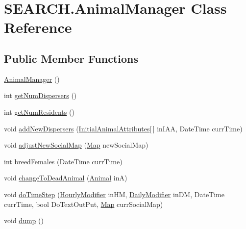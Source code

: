 \hypertarget{class_s_e_a_r_c_h_1_1_animal_manager}{\section{S\-E\-A\-R\-C\-H.\-Animal\-Manager Class Reference}
\label{class_s_e_a_r_c_h_1_1_animal_manager}
}
\subsection*{Public Member Functions}
\begin{DoxyCompactItemize}
\item 
\hyperlink{class_s_e_a_r_c_h_1_1_animal_manager_ab06ac6961b7e2e54209cd69799613b16}{Animal\-Manager} ()
\item 
int \hyperlink{class_s_e_a_r_c_h_1_1_animal_manager_af3d578bc12adec2c51f3ffd3d322f957}{get\-Num\-Dispersers} ()
\item 
int \hyperlink{class_s_e_a_r_c_h_1_1_animal_manager_add6db1dd2dfaa4335a508dd8357f6e3f}{get\-Num\-Residents} ()
\item 
void \hyperlink{class_s_e_a_r_c_h_1_1_animal_manager_a7d7b49737303ee1f5bb9e6774c2d1421}{add\-New\-Dispersers} (\hyperlink{class_s_e_a_r_c_h_1_1_initial_animal_attributes}{Initial\-Animal\-Attributes}\mbox{[}$\,$\mbox{]} in\-I\-A\-A, Date\-Time curr\-Time)
\item 
void \hyperlink{class_s_e_a_r_c_h_1_1_animal_manager_ac83809e22ce75662e738c06cb6b3f97a}{adjust\-New\-Social\-Map} (\hyperlink{class_s_e_a_r_c_h_1_1_map}{Map} new\-Social\-Map)
\item 
int \hyperlink{class_s_e_a_r_c_h_1_1_animal_manager_a09b650261c078d2435b8fe022b6fc19e}{breed\-Females} (Date\-Time curr\-Time)
\item 
void \hyperlink{class_s_e_a_r_c_h_1_1_animal_manager_aba58794e113743b4a8708e0b99a63fe2}{change\-To\-Dead\-Animal} (\hyperlink{class_s_e_a_r_c_h_1_1_animal}{Animal} in\-A)
\item 
void \hyperlink{class_s_e_a_r_c_h_1_1_animal_manager_a935cde1ac6704e8535d45746b64a3eb8}{do\-Time\-Step} (\hyperlink{class_s_e_a_r_c_h_1_1_hourly_modifier}{Hourly\-Modifier} in\-H\-M, \hyperlink{class_s_e_a_r_c_h_1_1_daily_modifier}{Daily\-Modifier} in\-D\-M, Date\-Time curr\-Time, bool Do\-Text\-Out\-Put, \hyperlink{class_s_e_a_r_c_h_1_1_map}{Map} curr\-Social\-Map)
\item 
void \hyperlink{class_s_e_a_r_c_h_1_1_animal_manager_a95e8ebd52daa94bac6c3b8cdad28512c}{dump} ()

\end{DoxyCompactItemize}
